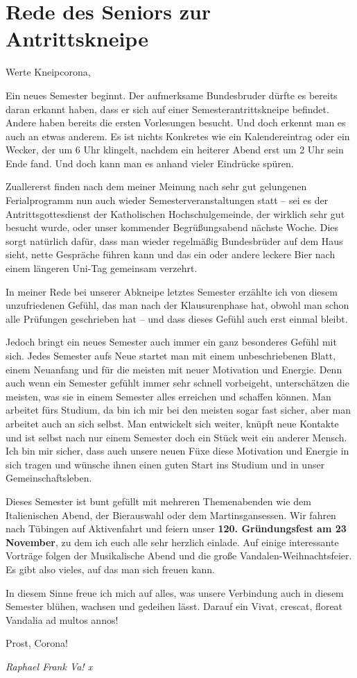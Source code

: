 \section{Rede des Seniors zur Antrittskneipe}
Werte Kneipcorona,
\begin{multicols}{2}

Ein neues
Semester beginnt. Der aufmerksame Bundesbruder dürfte es bereits daran erkannt
haben, dass er sich auf einer Semesterantrittskneipe befindet. Andere haben
bereits die ersten Vorlesungen besucht. Und doch erkennt man es auch an etwas
anderem. Es ist nichts Konkretes wie ein Kalendereintrag oder ein Wecker, der
um 6 Uhr klingelt, nachdem ein heiterer Abend erst um 2 Uhr sein Ende fand. Und
doch kann man es anhand vieler Eindrücke spüren.

Zuallererst
finden nach dem meiner Meinung nach sehr gut gelungenen Ferialprogramm nun auch
wieder Semesterveranstaltungen statt – sei es der Antrittsgottesdienst der
Katholischen Hochschulgemeinde, der wirklich sehr gut besucht wurde, oder unser
kommender Begrüßungsabend nächste Woche. Dies sorgt natürlich dafür, dass man
wieder regelmäßig Bundesbrüder auf dem Haus sieht, nette Gespräche führen kann
und das ein oder andere leckere Bier nach einem längeren Uni-Tag gemeinsam
verzehrt.

In meiner
Rede bei unserer Abkneipe letztes Semester erzählte ich von diesem
unzufriedenen Gefühl, das man nach der Klausurenphase hat, obwohl man schon
alle Prüfungen geschrieben hat – und dass dieses Gefühl auch erst einmal
bleibt.

Jedoch bringt ein neues Semester auch immer ein ganz besonderes Gefühl mit sich. Jedes
Semester aufs Neue startet man mit einem unbeschriebenen Blatt, \newline einem Neuanfang
und für die meisten mit neuer Motivation und Energie. Denn auch wenn ein
Semester gefühlt immer sehr schnell vorbeigeht, unterschätzen die meisten, was
sie in einem Semester alles erreichen und schaffen können. Man arbeitet fürs
Studium, da bin ich mir bei den meisten sogar fast sicher, aber man arbeitet
auch an sich selbst. Man entwickelt sich weiter, knüpft neue Kontakte und ist
selbst nach nur einem Semester doch ein Stück weit ein anderer Mensch. Ich bin
mir sicher, dass auch unsere neuen Füxe diese Motivation und Energie in sich
tragen und wünsche ihnen einen guten Start ins Studium und in unser
Gemeinschaftsleben.

Dieses Semester ist bunt gefüllt mit mehreren Themenabenden wie dem Italienischen
Abend, der Bierauswahl oder dem Martinsgansessen. Wir fahren nach Tübingen auf
Aktivenfahrt und feiern unser \textbf{120. Gründungsfest am 23 November}, zu dem
ich euch alle sehr herzlich einlade. Auf einige interessante Vorträge folgen
der Musikalische Abend und die große Vandalen-Weihnachtsfeier. Es gibt also
vieles, auf das man sich freuen kann.

In diesem
Sinne freue ich mich auf alles, was unsere Verbindung auch in diesem Semester
blühen, wachsen und gedeihen lässt. Darauf ein Vivat, crescat,
floreat Vandalia ad multos annos!

Prost, Corona!

	\begin{flushright}
		\hfill\emph{Raphael Frank Va! x}
	\end{flushright}
\end{multicols}

